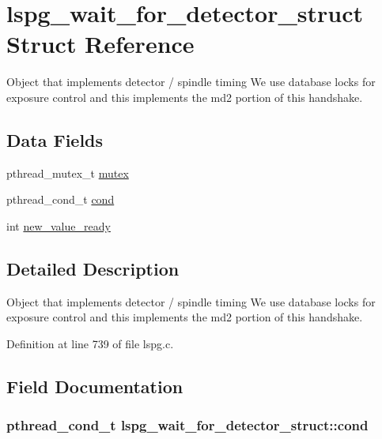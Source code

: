 \hypertarget{structlspg__wait__for__detector__struct}{\section{lspg\-\_\-wait\-\_\-for\-\_\-detector\-\_\-struct Struct Reference}
\label{structlspg__wait__for__detector__struct}
}


Object that implements detector / spindle timing We use database locks for exposure control and this implements the md2 portion of this handshake.  


\subsection*{Data Fields}
\begin{DoxyCompactItemize}
\item 
pthread\-\_\-mutex\-\_\-t \hyperlink{structlspg__wait__for__detector__struct_a958e9fe59e671e61f95c2ce796ba24ce}{mutex}
\item 
pthread\-\_\-cond\-\_\-t \hyperlink{structlspg__wait__for__detector__struct_aa97388f93ca5099196ba0da1e4a5b7bb}{cond}
\item 
int \hyperlink{structlspg__wait__for__detector__struct_ad950e85c70c4473c5c7c40f8ceeae61d}{new\-\_\-value\-\_\-ready}
\end{DoxyCompactItemize}


\subsection{Detailed Description}
Object that implements detector / spindle timing We use database locks for exposure control and this implements the md2 portion of this handshake. 

Definition at line 739 of file lspg.\-c.



\subsection{Field Documentation}
\hypertarget{structlspg__wait__for__detector__struct_aa97388f93ca5099196ba0da1e4a5b7bb}{
\subsubsection[{cond}]{\setlength{\rightskip}{0pt plus 5cm}pthread\-\_\-cond\-\_\-t lspg\-\_\-wait\-\_\-for\-\_\-detector\-\_\-struct\-::cond}}\label{structlspg__wait__for__detector__struct_aa97388f93ca5099196ba0da1e4a5b7bb}



